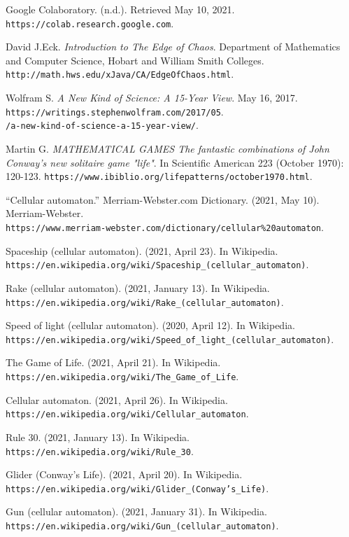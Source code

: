 \documentclass[12pt]{article}
\numberwithin{figure}{section} %
\begin{document}
\begin{thebibliography}{9}
Google Colaboratory. (n.d.). Retrieved May 10, 2021. 
\\\texttt{https://colab.research.google.com}. 

David J.Eck.
\textit{Introduction to The Edge of Chaos}.
Department of Mathematics and Computer Science, Hobart and William Smith Colleges. 
\\\texttt{http://math.hws.edu/xJava/CA/EdgeOfChaos.html}. 

Wolfram S. 
\textit{A New Kind of Science: A 15-Year View}.
May 16, 2017.
\\\texttt{https://writings.stephenwolfram.com/2017/05}. 
\\\texttt{/a-new-kind-of-science-a-15-year-view/}.
 
Martin G.
\textit{MATHEMATICAL GAMES The fantastic combinations of John Conway's new solitaire game "life"}.
In Scientific American 223 (October 1970): 120-123.
\texttt{https://www.ibiblio.org/lifepatterns/october1970.html}. 

“Cellular automaton.” Merriam-Webster.com Dictionary. (2021, May 10). Merriam-Webster. 
\\\texttt{https://www.merriam-webster.com/dictionary/cellular\%20automaton}. 

Spaceship (cellular automaton). (2021, April 23). In Wikipedia.
\\\texttt{https://en.wikipedia.org/wiki/Spaceship\_(cellular\_automaton)}.

Rake (cellular automaton). (2021, January 13). In Wikipedia.
\\\texttt{https://en.wikipedia.org/wiki/Rake\_(cellular\_automaton)}.

Speed of light (cellular automaton). (2020, April 12). In Wikipedia.
\\\texttt{https://en.wikipedia.org/wiki/Speed\_of\_light\_(cellular\_automaton)}.

The Game of Life. (2021, April 21). In Wikipedia. 
\\\texttt{https://en.wikipedia.org/wiki/The\_Game\_of\_Life}.

Cellular automaton. (2021, April 26). In Wikipedia. 
\\\texttt{https://en.wikipedia.org/wiki/Cellular\_automaton}.

Rule 30. (2021, January 13). In Wikipedia. 
\\\texttt{https://en.wikipedia.org/wiki/Rule\_30}.

Glider (Conway’s Life). (2021, April 20). In Wikipedia. 
\\\texttt{https://en.wikipedia.org/wiki/Glider\_(Conway’s\_Life)}.

Gun (cellular automaton). (2021, January 31). In Wikipedia. 
\\\texttt{https://en.wikipedia.org/wiki/Gun\_(cellular\_automaton)}.

\end{thebibliography}
\end{document}
